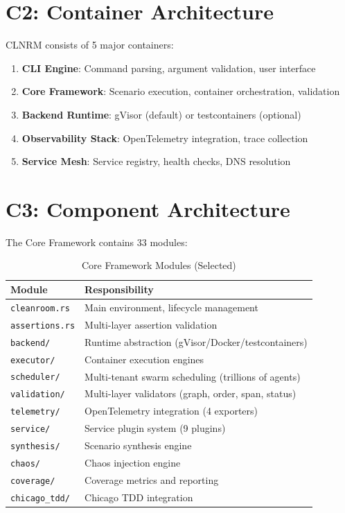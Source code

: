 \documentclass[12pt,twoside,openright]{book}
\theoremstyle{plain}
\theoremstyle{definition}
\theoremstyle{remark}
\begin{document}
\section{C2: Container Architecture}

CLNRM consists of 5 major containers:

\begin{enumerate}
  \item \textbf{CLI Engine}: Command parsing, argument validation, user interface
  \item \textbf{Core Framework}: Scenario execution, container orchestration, validation
  \item \textbf{Backend Runtime}: gVisor (default) or testcontainers (optional)
  \item \textbf{Observability Stack}: OpenTelemetry integration, trace collection
  \item \textbf{Service Mesh}: Service registry, health checks, DNS resolution
\end{enumerate}

\section{C3: Component Architecture}

The Core Framework contains 33 modules:

\begin{table}[H]
\centering
\small
\begin{tabular}{|p{2.2cm}|p{3.5cm}|}
\hline
\textbf{Module} & \textbf{Responsibility} \\
\hline
\texttt{cleanroom.rs} & Main environment, lifecycle management \\
\hline
\texttt{assertions.rs} & Multi-layer assertion validation \\
\hline
\texttt{backend/} & Runtime abstraction (gVisor/Docker/testcontainers) \\
\hline
\texttt{executor/} & Container execution engines \\
\hline
\texttt{scheduler/} & Multi-tenant swarm scheduling (trillions of agents) \\
\hline
\texttt{validation/} & Multi-layer validators (graph, order, span, status) \\
\hline
\texttt{telemetry/} & OpenTelemetry integration (4 exporters) \\
\hline
\texttt{service/} & Service plugin system (9 plugins) \\
\hline
\texttt{synthesis/} & Scenario synthesis engine \\
\hline
\texttt{chaos/} & Chaos injection engine \\
\hline
\texttt{coverage/} & Coverage metrics and reporting \\
\hline
\texttt{chicago\_tdd/} & Chicago TDD integration \\
\hline
\end{tabular}
\caption{Core Framework Modules (Selected)}
\label{tab:core_modules}
\end{table}
\end{document}
